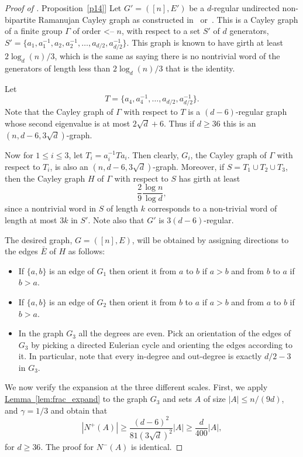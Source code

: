 \documentclass[11pt]{article}
\numberwithin{equation}{section}
\theoremstyle{definition}
\theoremstyle{plain}
\newcommand{\expref}[2]{\hyperref[#2]{#1~\ref{#2}}}
\begin{document}
\begin{proof}[Proof of \expref{Proposition}{p14}]
Let $G'=([n],E')$ be a $d$-regular 
undirected non-bipartite Ramanujan Cayley graph as constructed in~\cite{LPS} or~\cite{Ma}. 
%
This is a Cayley graph of a finite group $\Gamma$ of
%
order  <--
$n$, with respect to a set $S'$ of $d$ generators,
$S' = \{a_1, a_1^{-1}, a_2, a_2^{-1},\ldots, a_{d/2}, a_{d/2}^{-1}\}$. 
This graph is known to have girth at least $2 \log_d(n)/3 $, which is
the same as saying there is no nontrivial word of the generators of
length less than $2 \log_d(n)/3$ that is the identity. 

Let
\[
  T = \bigl\{a_4,a_4^{-1},\ldots,a_{d/2},a_{d/2}^{-1}\bigr\}.
\]
Note that the Cayley graph of $\Gamma$ with respect to $T$ is a
%
$(d-6)$-regular  %
graph whose second eigenvalue is at most $2 \sqrt{d} +6$.
Thus if $ d \geq 36$ this is an $(n,d-6,3 \sqrt{d})$-graph.

Now for $1 \leq i \leq 3$, let $T_i = a_i^{-1} T a_i$. 
Then clearly, $G_i$, the Cayley graph  of $\Gamma$ with respect to $T_i$,
is also an $(n,d-6,3 \sqrt{d})$-graph. Moreover,
if $S = T_1 \cup T_2 \cup T_3$, then the Cayley graph $H$ of 
$\Gamma$ with respect to $S$ has girth at least
\[
  \frac{2}{9} \frac{\log n}{\log d},
\]
since a nontrivial word in $S$ of length $k$ corresponds to a
non-trivial word of length at most $3 k$ in $S'$.  Note also that $G'$
is $3(d-6)$-regular.

The desired graph, $G=([n],E)$, will be obtained by assigning directions
to the edges $\bar{E}$ of $H$ as follows: 
%
%
\begin{itemize}
\item If $\{a,b\}$ is an edge of $G_1$ then orient it from $a$ to $b$ if $a > b$ and from $b$ to $a$ if $b > a$.
\item If $\{a,b\}$ is an edge of $G_2$ then orient it from $b$ to $a$ if $a > b$ and from $a$ to $b$ if $b > a$.
\item In the graph $G_3$ all the degrees are even. Pick an orientation
of the edges of 
$G_3$ by picking a directed Eulerian cycle and orienting the edges
according to it. In particular, note that every
in-degree and out-degree is exactly $d/2-3$ in $G_3$. 
\end{itemize} 

We now verify the expansion at the three different scales.
First, we apply \expref{Lemma}{lem:frac_expand} to the graph $G_3$ and
sets $A$ of size $|A| \leq n/(9d)$, 
%
%
%
 and $\gamma = 1/3$ and obtain that 
\[
|N^{+}(A)| \geq \frac{(d-6)^2}{81 (3 {\sqrt d})^2} |A| \geq \frac{d}{400} |A|,
\]
for $d \geq 36$. The proof for $N^{-}(A)$ is identical. 
 


\end{proof}
\end{document}
